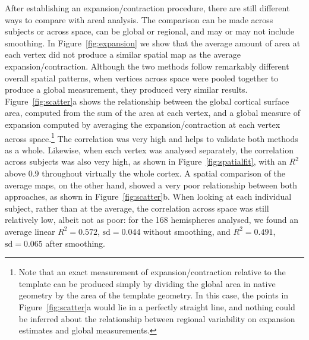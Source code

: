 After establishing an expansion/contraction procedure, there are still different ways to compare with areal analysis. The comparison can be made across subjects or across space, can be global or regional, and may or may not include smoothing. In Figure~\ref{fig:expansion} we show that the average amount of area at each vertex did not produce a similar spatial map as the average expansion/contraction. Although the two methods follow remarkably different overall spatial patterns, when vertices across space were pooled together to produce a global measurement, they produced very similar results. Figure~\ref{fig:scatter}a shows the relationship between the global cortical surface area, computed from the sum of the area at each vertex, and a global measure of expansion computed by averaging the expansion/contraction at each vertex across space.\footnote{Note that an exact measurement of expansion/contraction relative to the template can be produced simply by dividing the global area in native geometry by the area of the template geometry. In this case, the points in Figure~\ref{fig:scatter}a would lie in a perfectly straight line, and nothing could be inferred about the relationship between regional variability on expansion estimates and global measurements.} The correlation was very high and helps to validate both methods as a whole. Likewise, when each vertex was analysed separately, the correlation across subjects was also very high, as shown in Figure~\ref{fig:spatialfit}, with an $R^2$ above 0.9 throughout virtually the whole cortex. A spatial comparison of the average maps, on the other hand, showed a very poor relationship between both approaches, as shown in Figure~\ref{fig:scatter}b. When looking at each individual subject, rather than at the average, the correlation across space was still relatively low, albeit not as poor: for the 168 hemispheres analysed, we found an average linear $R^2=0.572$, $\text{sd}=0.044$ without smoothing, and $R^2=0.491$, $\text{sd}=0.065$ after smoothing.

